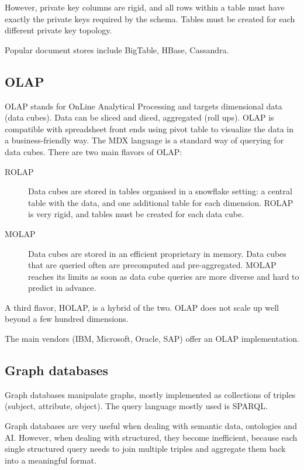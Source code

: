 \documentclass{vldb}
\begin{document}
However, private key columns are rigid, and all rows within a table must have exactly the private keys required by the schema. Tables must be created for each different private key topology.

Popular document stores include BigTable, HBase, Cassandra.

\subsection{OLAP}

OLAP stands for OnLine Analytical Processing and targets dimensional data (data cubes). Data can be sliced and diced, aggregated (roll ups). OLAP is compatible with spreadsheet front ends using pivot table to visualize the data in a business-friendly way. The MDX language is a standard way of querying for data cubes. There are two main flavors of OLAP:
\begin{description}
\item[ROLAP] Data cubes are stored in tables organised in a snowflake setting: a central table with the data, and one additional table for each dimension. ROLAP is very rigid, and tables must be created for each data cube.
\item[MOLAP] Data cubes are stored in an efficient proprietary in memory. Data cubes that are queried often are precomputed and pre-aggregated. MOLAP reaches its limits as soon as data cube queries are more diverse and hard to predict in advance.
\end{description}

A third flavor, HOLAP, is a hybrid of the two. OLAP does not scale up well beyond a few hundred dimensions.

The main vendors (IBM, Microsoft, Oracle, SAP) offer an OLAP implementation.

\subsection{Graph databases}

Graph databases manipulate graphs, mostly implemented as collections of triples (subject, attribute, object). The query language mostly used is SPARQL.

Graph databases are very useful when dealing with semantic data, ontologies and AI. However, when dealing with structured, they become inefficient, because each single structured query needs to join multiple triples and aggregate them back into a meaningful format.
\end{document}
